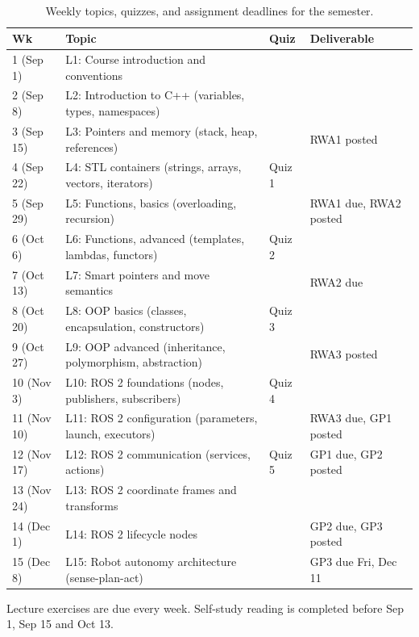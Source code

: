 \documentclass[
    10pt,
    dvipsnames,
    svgnames,
    x11names,
    aspectratio=1610,
    english,
    codeminted]{beamer}
\begin{document}
\begin{frame}[fragile]{\secname}
\framesubtitle{\subsecname}

\begin{table}[h]
\caption{Weekly topics, quizzes, and assignment deadlines for the semester.}
\scriptsize\centering
\renewcommand{\arraystretch}{1.15}
\begin{tabular}{m{1.3cm}m{7.1cm}m{0.9cm}m{3.6cm}}
  \toprule
  \textbf{Wk} & \textbf{Topic} & \textbf{Quiz} & \textbf{Deliverable} \\
  \midrule
  1 (Sep 1)   & L1: Course introduction and conventions                    &        &                     \\
  2 (Sep 8)   & L2: Introduction to C++ (variables, types, namespaces)     &        &                     \\
  3 (Sep 15)  & L3: Pointers and memory (stack, heap, references)          &        & RWA1 posted         \\
  4 (Sep 22)  & L4: STL containers (strings, arrays, vectors, iterators)   & Quiz 1 &                     \\
  5 (Sep 29)  & L5: Functions, basics (overloading, recursion)             &        & RWA1 due, RWA2 posted \\
  6 (Oct 6)   & L6: Functions, advanced (templates, lambdas, functors)     & Quiz 2 &                     \\
  7 (Oct 13)  & L7: Smart pointers and move semantics                      &        & RWA2 due            \\
  8 (Oct 20)  & L8: OOP basics (classes, encapsulation, constructors)      & Quiz 3 &                     \\
  9 (Oct 27)  & L9: OOP advanced (inheritance, polymorphism, abstraction)  &        & RWA3 posted         \\
  10 (Nov 3)  & L10: ROS 2 foundations (nodes, publishers, subscribers)    & Quiz 4 &                     \\
  11 (Nov 10) & L11: ROS 2 configuration (parameters, launch, executors)   &        & RWA3 due, GP1 posted \\
  12 (Nov 17) & L12: ROS 2 communication (services, actions)               & Quiz 5 & GP1 due, GP2 posted \\
  13 (Nov 24) & L13: ROS 2 coordinate frames and transforms                &        &                     \\
  14 (Dec 1)  & L14: ROS 2 lifecycle nodes                                 &        & GP2 due, GP3 posted \\
  15 (Dec 8)  & L15: Robot autonomy architecture (sense-plan-act)          &        & GP3 due Fri, Dec 11 \\
  \bottomrule
\end{tabular}
\end{table}
Lecture exercises are due every week. Self-study reading is completed before Sep 1, Sep 15 and Oct 13.
\end{frame}
\end{document}
